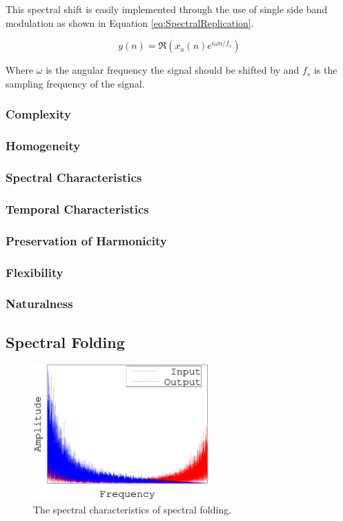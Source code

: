 		This spectral shift is easily implemented through the use of single side band modulation as shown in
		Equation \ref{eq:SpectralReplication}.

		\begin{equation}
			y(n) = \Re \left( x_{a}(n) e^{i\omega  n/ f_{s}} \right)
			\label{eq:SpectralReplication}
		\end{equation}

		Where $\omega$ is the angular frequency the signal should be shifted by and $f_{s}$ is the sampling
		frequency of the signal.

		\subsubsection*{Complexity}
		\subsubsection*{Homogeneity}
		\subsubsection*{Spectral Characteristics}
		\subsubsection*{Temporal Characteristics}
		\subsubsection*{Preservation of Harmonicity}
		\subsubsection*{Flexibility}
		\subsubsection*{Naturalness}

	\subsection{Spectral Folding}
	\label{sec:Excitation-SpectralFolding}
	
		\begin{figure}[h!]
			\centering
			\includegraphics[width=0.6\textwidth]{chapter3/Images/SpectralFolding.eps}
			\caption{The spectral characteristics of spectral folding.}
			\label{fig:SpectralFolding}
		\end{figure}

